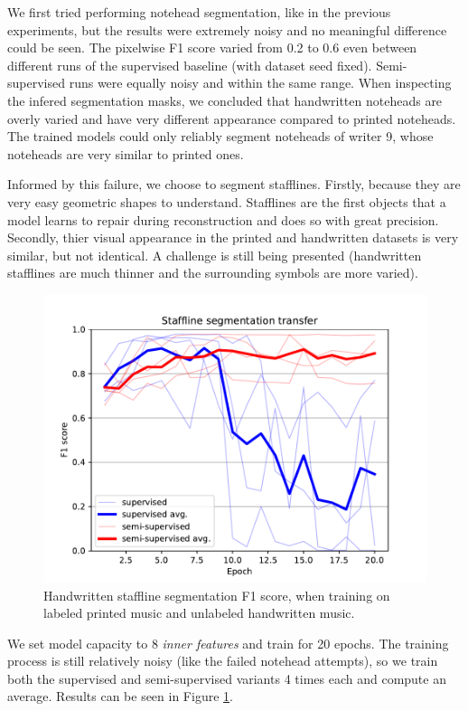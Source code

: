 We first tried performing notehead segmentation, like in the previous experiments, but the results were extremely noisy and no meaningful difference could be seen. The pixelwise F1 score varied from 0.2 to 0.6 even between different runs of the supervised baseline (with dataset seed fixed). Semi-supervised runs were equally noisy and within the same range. When inspecting the infered segmentation masks, we concluded that handwritten noteheads are overly varied and have very different appearance compared to printed noteheads. The trained models could only reliably segment noteheads of writer 9, whose noteheads are very similar to printed ones.

Informed by this failure, we choose to segment stafflines. Firstly, because they are very easy geometric shapes to understand. Stafflines are the first objects that a model learns to repair during reconstruction and does so with great precision. Secondly, thier visual appearance in the printed and handwritten datasets is very similar, but not identical. A challenge is still being presented (handwritten stafflines are much thinner and the surrounding symbols are more varied).

\begin{figure}[ht]
    \centering
    \includegraphics[width=140mm]{../../figures/04-staffline-transfer/transfer.pdf}
    \caption{Handwritten staffline segmentation F1 score, when training on labeled printed music and unlabeled handwritten music.}
    \label{fig:StafflineTransfer}
\end{figure}

We set model capacity to 8 \emph{inner features} and train for 20 epochs. The training process is still relatively noisy (like the failed notehead attempts), so we train both the supervised and semi-supervised variants 4 times each and compute an average. Results can be seen in Figure \ref{fig:StafflineTransfer}.

